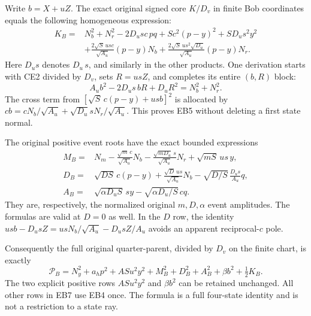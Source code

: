 Write $b=X+uZ$. The exact original signed core $K/D_v$ in finite
Bob coordinates equals the following homogeneous expression:
\[
\begin{split}
 K_B={}&N_b^2+N_r^2-2D_usc\,pq
       +Sc^2(p-y)^2+SD_us^2y^2\\
 &+\frac{2\sqrt S\,usc}{\sqrt{A_u}}(p-y)N_b
  +\frac{2\sqrt S\,us^2\sqrt{D_u}}{\sqrt{A_u}}(p-y)N_r.
\end{split}                                                    \tag{EB5}
\]
Here $D_us$ denotes $D_u\,s$, and similarly in the other products.
One derivation starts with CE2 divided by $D_v$, sets
$R=usZ$, and completes its entire $(b,R)$ block:
\[
 A_ub^2-2D_us\,bR+D_uR^2=N_b^2+N_r^2.
\]
The cross term from
$[\sqrt S\,c(p-y)+usb]^2$ is allocated by
$cb=cN_b/\sqrt{A_u}+\sqrt{D_u}sN_r/\sqrt{A_u}$.
This proves EB5 without deleting a first state normal.

The original positive event roots have the exact bounded expressions
\[
 \begin{split}
 M_B={}&N_m-\frac{\sqrt m\,c}{\sqrt{A_u}}N_b
       -\frac{\sqrt{mD_u}\,s}{\sqrt{A_u}}N_r
       +\sqrt{mS}\,us\,y,\\
 D_B={}&\sqrt{DS}\,c(p-y)
       +\frac{\sqrt D\,us}{\sqrt{A_u}}N_b
       -\sqrt{D/S}\,\frac{D_us}{A_u}q,\\
 A_B={}&\sqrt{\alpha D_uS}\,s y
       -\sqrt{\alpha D_u/S}\,c q.
 \end{split}                                                   \tag{EB6}
\]
They are, respectively, the normalized original $m,D,\alpha$ event
amplitudes. The formulas are valid at $D=0$ as well. In the $D$ row,
the identity
$usb-D_usZ=usN_b/\sqrt{A_u}-D_usZ/A_u$
avoids an apparent reciprocal-$c$ pole.

Consequently the full original quarter-parent, divided by $D_v$ on
the finite chart, is exactly
\[
 \mathcal P_B=N_y^2+a_hp^2+ASu^2y^2
              +M_B^2+D_B^2+A_B^2+\beta b^2+\tfrac12K_B.
                                                               \tag{EB7}
\]
The two explicit positive rows $ASu^2y^2$ and $\beta b^2$ can be
retained unchanged. All other rows in EB7 use EB4 once. The formula
is a full four-state identity and is not a restriction to a state ray.


